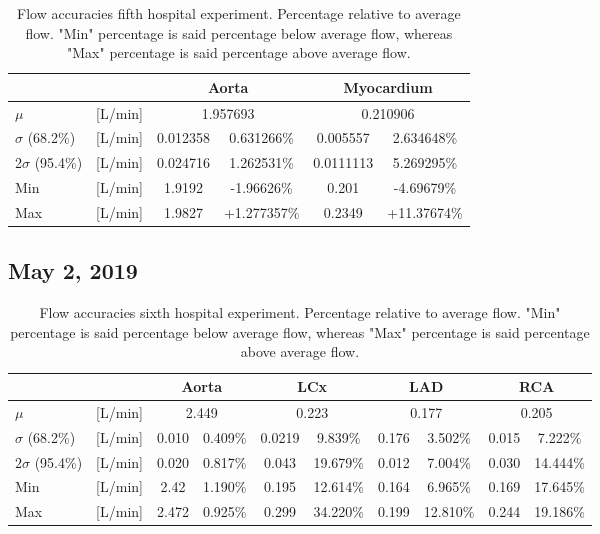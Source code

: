 \begin{table}[H]
\caption{Flow accuracies fifth hospital experiment. Percentage relative to average flow. "Min" percentage is said percentage below average flow, whereas "Max" percentage is said percentage above average flow.}
\label{tab:hospital_fifth}
\begin{tabular}{lc|cccc|}
					&    		& \multicolumn{2}{c}{Aorta} 					& \multicolumn{2}{c}{Myocardium} 		\\ \hline
$\mu$ 		& [L/min]   & \multicolumn{2}{c}{1.957693} & \multicolumn{2}{c|}{0.210906} \\
$\sigma$ (68.2\%) 	& [L/min]	& 0.012358 & 0.631266\%		& 0.005557 & 2.634648\%                          	\\
2$\sigma$ (95.4\%) 	& [L/min] 	& 0.024716 & 1.262531\%		& 0.0111113 &  5.269295\%                         				\\
Min 				& [L/min]  	& 1.9192 & -1.96626\% &  0.201 & -4.69679\% \\
Max 				& [L/min]	& 1.9827 & +1.277357\%  & 0.2349 & +11.37674\% \\ \cline{3-6} 
\end{tabular}
\end{table}

\subsection*{May 2, 2019}

\begin{table}[H]
\caption{Flow accuracies sixth hospital experiment. Percentage relative to average flow. "Min" percentage is said percentage below average flow, whereas "Max" percentage is said percentage above average flow.}
\label{tab:hospital_sixth}
\begin{adjustwidth}{-0.25cm}{0cm}
\begin{tabular}{ll|cccccccc|}
                   &             & \multicolumn{2}{c}{Aorta} & \multicolumn{2}{c}{LCx}   & \multicolumn{2}{c}{LAD}   & \multicolumn{2}{c}{RCA}   \\ \hline
$\mu$              & {[}L/min{]} & \multicolumn{2}{c}{2.449} & \multicolumn{2}{c}{0.223} & \multicolumn{2}{c}{0.177} & \multicolumn{2}{c|}{0.205} \\
$\sigma$ (68.2\%)  & {[}L/min{]} & 0.010      & 0.409\%      & 0.0219     & 9.839\%      & 0.176     & 3.502\%       & 0.015      & 7.222\%      \\
$2\sigma$ (95.4\%) & {[}L/min{]} & 0.020      & 0.817\%        & 0.043      & 19.679\%     & 0.012     & 7.004\%       & 0.030      & 14.444\%     \\
Min                & {[}L/min{]} & 2.42       & 1.190\%     & 0.195      & 12.614\%    & 0.164     & 6.965\%      & 0.169     & 17.645\%    \\
Max                & {[}L/min{]} & 2.472      & 0.925\%     & 0.299      & 34.220\%    & 0.199     & 12.810\%     & 0.244      & 19.186\%   \\
\cline{3-10}
\end{tabular}
\end{adjustwidth}
\end{table}

